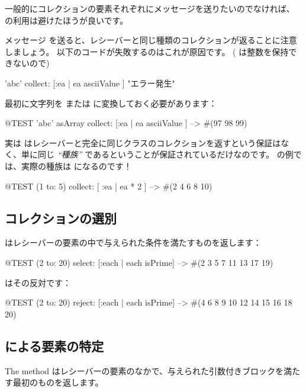 \documentclass[a4paper,10pt,twoside]{book}
\begin{document}
一般的にコレクションの要素それぞれにメッセージを送りたいのでなければ、 の利用は避けたほうが良いです。

メッセージ  を送ると、レシーバーと同じ種類のコレクションが返ることに注意しましょう。
以下のコードが失敗するのはこれが原因です。
( は整数を保持できないので)
\begin{code}{}
'abc' collect: [:ea | ea asciiValue ]      "エラー発生"
\end{code}
\noindent
最初に文字列を  または  に変換しておく必要があります：
\begin{code}{@TEST}
'abc' asArray collect: [:ea | ea asciiValue ] --> #(97 98 99)
\end{code}

実は  はレシーバーと完全に同じクラスのコレクションを返すという保証はなく、単に同じ \emph{``種族''} であるということが保証されているだけなのです。 の例では、実際の種族は  になるのです！
\begin{code}{@TEST}
(1 to: 5) collect: [ :ea | ea * 2 ] --> #(2 4 6 8 10)
\end{code}

\subsection{コレクションの選別}

 はレシーバーの要素の中で与えられた条件を満たすものを返します：

\begin{code}{@TEST}
(2 to: 20) select: [:each | each isPrime] --> #(2 3 5 7 11 13 17 19)
\end{code}

 はその反対です：
\begin{code}{@TEST}
(2 to: 20) reject: [:each | each isPrime] --> #(4 6 8 9 10 12 14 15 16 18 20)
\end{code}

\subsection{ による要素の特定}
The method  はレシーバーの要素のなかで、与えられた引数付きブロックを満たす最初のものを返します。
\end{document}
